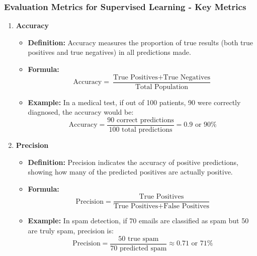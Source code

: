 \documentclass{beamer}
\begin{document}
\begin{frame}[fragile]
    \frametitle{Evaluation Metrics for Supervised Learning - Key Metrics}
    \begin{enumerate}
        \item \textbf{Accuracy}
        \begin{itemize}
            \item \textbf{Definition:} Accuracy measures the proportion of true results (both true positives and true negatives) in all predictions made.
            \item \textbf{Formula:}
            \begin{equation}
            \text{Accuracy} = \frac{\text{True Positives} + \text{True Negatives}}{\text{Total Population}}
            \end{equation}
            \item \textbf{Example:} In a medical test, if out of 100 patients, 90 were correctly diagnosed, the accuracy would be:
            \begin{equation}
            \text{Accuracy} = \frac{90 \text{ correct predictions}}{100 \text{ total predictions}} = 0.9 \text{ or } 90\%
            \end{equation}
        \end{itemize}
        
        \item \textbf{Precision}
        \begin{itemize}
            \item \textbf{Definition:} Precision indicates the accuracy of positive predictions, showing how many of the predicted positives are actually positive.
            \item \textbf{Formula:}
            \begin{equation}
            \text{Precision} = \frac{\text{True Positives}}{\text{True Positives} + \text{False Positives}}
            \end{equation}
            \item \textbf{Example:} In spam detection, if 70 emails are classified as spam but 50 are truly spam, precision is:
            \begin{equation}
            \text{Precision} = \frac{50 \text{ true spam}}{70 \text{ predicted spam}} \approx 0.71 \text{ or } 71\%
            \end{equation}
        \end{itemize}
    \end{enumerate}
\end{frame}
\end{document}
